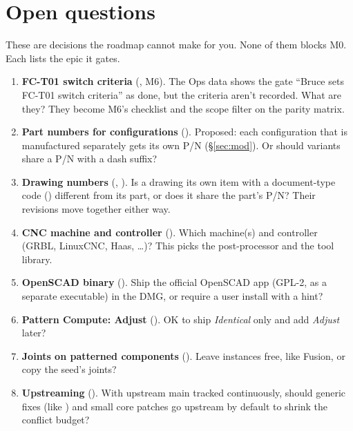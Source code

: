 \section{Open questions}\label{sec:questions}

These are decisions the roadmap cannot make for you. None of them blocks M0. Each lists the epic it gates.

\begin{enumerate}[label=Q\arabic*.,ref=Q\arabic*]
  \item\label{q:fct01} \textbf{FC-T01 switch criteria} (, M6). The Ops data shows the gate
        ``Bruce sets FC-T01 switch criteria'' as done, but the criteria aren't recorded. What are they? They
        become M6's checklist and the scope filter on the parity matrix.
  \item\label{q:cfgpn} \textbf{Part numbers for configurations} (). Proposed: each configuration
        that is manufactured separately gets its own P/N (\S\ref{sec:mod}). Or should variants share a P/N with
        a dash suffix?
  \item\label{q:dwgpn} \textbf{Drawing numbers} (, ). Is a drawing its own item with
        a document-type code () different from its part, or does it share the part's P/N? Their
        revisions move together either way.
  \item\label{q:cnc} \textbf{CNC machine and controller} (). Which machine(s) and controller
        (GRBL, LinuxCNC, Haas, \ldots)? This picks the post-processor and the tool library.
  \item\label{q:openscad} \textbf{OpenSCAD binary} (). Ship the official OpenSCAD app (GPL-2, as a
        separate executable) in the DMG, or require a user install with a hint?
  \item\label{q:compute} \textbf{Pattern Compute: Adjust} (). OK to ship \emph{Identical} only
        and add \emph{Adjust} later?
  \item \textbf{Joints on patterned components} (). Leave instances free, like Fusion, or
        copy the seed's joints?
  \item \textbf{Upstreaming} (). With upstream main tracked continuously, should generic fixes
        (like ) and small core patches go upstream by default to shrink the conflict budget?

\end{enumerate}
